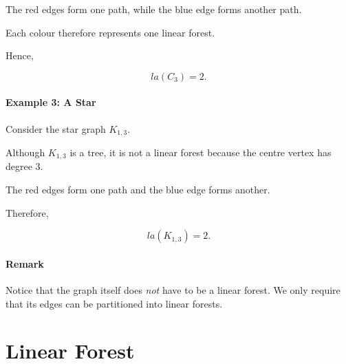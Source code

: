 \documentclass[11pt]{article}
\theoremstyle{plain}
\theoremstyle{definition}
\theoremstyle{remark}
\begin{document}
\begin{center}
\end{center}

The red edges form one path, while the blue edge forms another path.

Each colour therefore represents one linear forest.

Hence,

\[
la(C_3)=2.
\]

\paragraph{Example 3: A Star}

Consider the star graph $K_{1,3}$.

\begin{center}
\end{center}

Although $K_{1,3}$ is a tree, it is not a linear forest because the centre vertex has degree $3$.

The red edges form one path and the blue edge forms another.

Therefore,

\[
la(K_{1,3})=2.
\]

\paragraph{Remark}

Notice that the graph itself does \emph{not} have to be a linear forest. We only require that its edges can be partitioned into linear forests.

\hrulefill
\section*{Linear Forest}
\end{document}
